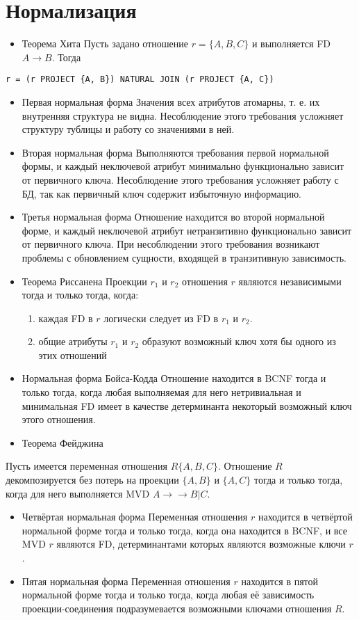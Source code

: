 \documentclass[11pt]{article}
\begin{document}
\section{Нормализация}
\label{sec:org082e95a}
\begin{itemize}
\item Теорема Хита
Пусть задано отношение \(r = \{A, B, C\}\) и выполняется FD \(A \to B\). Тогда
\end{itemize}
\begin{verbatim}
r = (r PROJECT {A, B}) NATURAL JOIN (r PROJECT {A, C})
\end{verbatim}
\begin{itemize}
\item Первая нормальная форма
Значения всех атрибутов атомарны, т. е. их внутренняя структура не видна. Несоблюдение этого требования усложняет структуру тублицы и работу со значениями в ней.
\item Вторая нормальная форма
Выполняются требования первой нормальной формы, и каждый неключевой атрибут минимально функционально зависит от первичного ключа. Несоблюдение этого требования усложняет работу с БД, так как первичный ключ содержит избыточную информацию.
\item Третья нормальная форма
Отношение находится во второй нормальной форме, и каждый неключевой атрибут нетранзитивно функционально зависит от первичного ключа. При несоблюдении этого требования возникают проблемы с обновлением сущности, входящей в транзитивную зависимость.
\item Теорема Риссанена
Проекции \(r_1\) и \(r_2\) отношения \(r\) являются независимыми тогда и только тогда, когда:
\begin{enumerate}
\item каждая FD в \(r\) логически следует из FD в \(r_1\) и \(r_2\).
\item общие атрибуты \(r_1\) и \(r_2\) образуют возможный ключ хотя бы одного из этих отношений
\end{enumerate}
\item Нормальная форма Бойса-Кодда
Отношение находится в BCNF тогда и только тогда, когда любая выполняемая для него нетривиальная и минимальная FD имеет в качестве детерминанта некоторый возможный ключ этого отношения.
\item Теорема Фейджина
\end{itemize}
Пусть имеется переменная отношения \(R\{A, B, C\}\). Отношение \(R\) декомпозируется без потерь на проекции \(\{A, B\}\) и \(\{A, C\}\) тогда и только тогда, когда для него выполняется MVD \(A \to\to B | C\).
\begin{itemize}
\item Четвёртая нормальная форма
Переменная отношения \(r\) находится в четвёртой нормальной форме тогда и только тогда, когда она находится в BCNF, и все MVD \(r\) являются FD, детерминантами которых являются возможные ключи \(r\).
\item Пятая нормальная форма
Переменная отношения \(r\) находится в пятой нормальной форме тогда и только тогда, когда любая её зависимость проекции-соединения подразумевается возможными ключами отношения \(R\).
\end{itemize}
\end{document}
